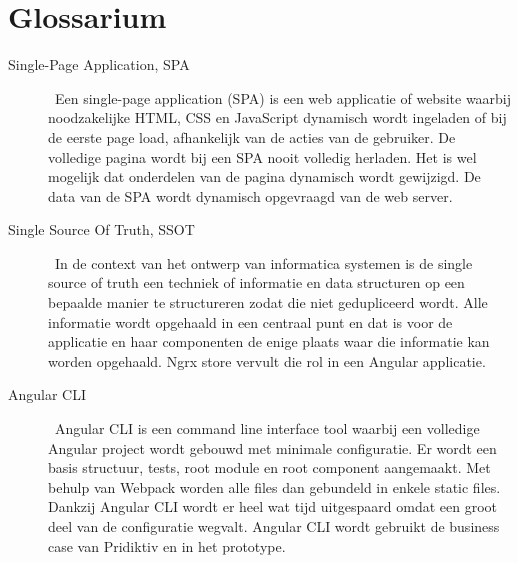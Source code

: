 
\chapter{Glossarium}
\label{ch:glossarium}


\begin{description}
\item[Single-Page Application, SPA] \hfill \ Een single-page application (SPA) is een web applicatie of website waarbij noodzakelijke HTML, CSS en JavaScript dynamisch wordt ingeladen of bij de eerste page load, afhankelijk van de acties van de gebruiker. De volledige pagina wordt bij een SPA nooit volledig herladen. Het is wel mogelijk dat onderdelen van de pagina dynamisch wordt gewijzigd. De data van de SPA wordt dynamisch opgevraagd van de web server. 
\item[Single Source Of Truth, SSOT] \hfill \ In de context van het ontwerp van informatica systemen is de single source of truth een techniek of informatie en data structuren op een bepaalde manier te structureren zodat die niet gedupliceerd wordt. Alle informatie wordt opgehaald in een centraal punt en dat is voor de applicatie en haar componenten de enige plaats waar die informatie kan worden opgehaald. Ngrx store vervult die rol in een Angular applicatie.
\item[Angular CLI] \hfill \ Angular CLI is een command line interface tool waarbij een volledige Angular project wordt gebouwd met minimale configuratie. Er wordt een basis structuur, tests, root module en root component aangemaakt. Met behulp van Webpack worden alle files dan gebundeld in enkele static files. Dankzij Angular CLI wordt er heel wat tijd uitgespaard omdat een groot deel van de configuratie wegvalt. Angular CLI wordt gebruikt de business case van Pridiktiv en in het prototype.
\end{description}